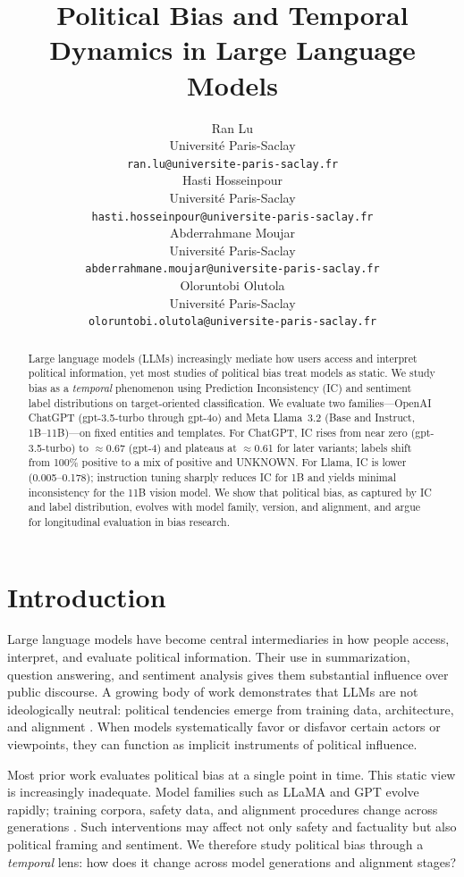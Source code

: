 \documentclass[11pt]{article}
\title{Political Bias and Temporal Dynamics in Large Language Models}
\author{Ran Lu \\
  Université Paris-Saclay \\
  \texttt{ran.lu@universite-paris-saclay.fr} \\\And
  Hasti Hosseinpour \\
  Université Paris-Saclay \\
  \texttt{hasti.hosseinpour@universite-paris-saclay.fr} \\\And
  Abderrahmane Moujar \\
  Université Paris-Saclay \\
  \texttt{abderrahmane.moujar@universite-paris-saclay.fr} \\\And
  Oloruntobi Olutola \\
  Université Paris-Saclay \\
  \texttt{oloruntobi.olutola@universite-paris-saclay.fr}}
\begin{document}
\maketitle

\begin{abstract}
Large language models (LLMs) increasingly mediate how users access and interpret political information, yet most studies of political bias treat models as static. We study bias as a \emph{temporal} phenomenon using Prediction Inconsistency (IC) and sentiment label distributions on target-oriented classification. We evaluate two families---OpenAI ChatGPT (gpt-3.5-turbo through gpt-4o) and Meta Llama~3.2 (Base and Instruct, 1B--11B)---on fixed entities and templates. For ChatGPT, IC rises from near zero (gpt-3.5-turbo) to $\approx$0.67 (gpt-4) and plateaus at $\approx$0.61 for later variants; labels shift from 100\% positive to a mix of positive and UNKNOWN. For Llama, IC is lower (0.005--0.178); instruction tuning sharply reduces IC for 1B and yields minimal inconsistency for the 11B vision model. We show that political bias, as captured by IC and label distribution, evolves with model family, version, and alignment, and argue for longitudinal evaluation in bias research.
\end{abstract}

\section{Introduction}

Large language models have become central intermediaries in how people access, interpret, and evaluate political information. Their use in summarization, question answering, and sentiment analysis gives them substantial influence over public discourse. A growing body of work demonstrates that LLMs are not ideologically neutral: political tendencies emerge from training data, architecture, and alignment \citep{santurkar2023,buyl2026,hartmann2023,bang2024}. When models systematically favor or disfavor certain actors or viewpoints, they can function as implicit instruments of political influence.

Most prior work evaluates political bias at a single point in time. This static view is increasingly inadequate. Model families such as LLaMA and GPT evolve rapidly; training corpora, safety data, and alignment procedures change across generations \citep{touvron2023,dubey2024}. Such interventions may affect not only safety and factuality but also political framing and sentiment. We therefore study political bias through a \emph{temporal} lens: how does it change across model generations and alignment stages?
\end{document}
